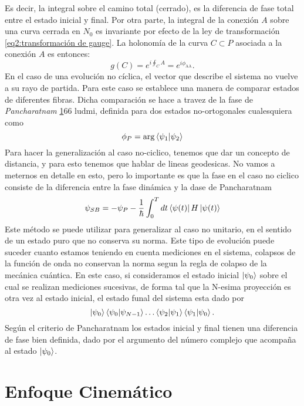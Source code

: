 Es decir, la integral sobre el camino total (cerrado), es la diferencia de fase total entre el estado inicial y final. Por otra parte, la integral de la conexión \( A \) sobre una curva cerrada en \( N_0 \) es invariante por efecto de la ley de transformación \ref{eq2:transformación de gauge}. La holonomía de la curva \( C \subset P \) asociada a la conexión \( A \) es entonces:
\begin{equation}
g(C) = e^{i \oint_C A} = e^{i\phi_{\text{AA}}}.
\end{equation}
En el caso de una evolución no cíclica, el vector que describe el sistema no vuelve a su rayo de partida. Para este caso se establece una manera de comparar estados de diferentes fibras. Dicha comparación se hace a travez de la fase de \textit{Pancharatnam} \ref{}66 ludmi, definida para dos estados no-ortogonales cualesquiera como
\begin{equation}
    \phi_P = \arg \braket{\psi_1}{\psi_2}
\end{equation}
Para hacer la generalización al caso no-ciclico, tenemos que dar un concepto de distancia, y para esto tenemos que hablar de lineas geodesicas. No vamos a meternos en detalle en esto, pero lo importante es que la fase en el caso no ciclico consiste de la diferencia entre la fase dinámica y la dase de Pancharatnam
\begin{equation}
    \psi_{SB}=-\psi_P-\frac{1}{\hbar}\int_0^Tdt\bra{\psi(t)}H\ket{\psi(t)}
\end{equation}
Este método se puede utilizar para generalizar al caso no unitario, en el sentido de un estado puro que no conserva su norma. Este tipo de evolución puede suceder cuanto estamos teniendo en cuenta mediciones en el sistema, colapsos de la función de onda no conservan la norma segun la regla de colapso de la mecánica cuántica. En este caso, si consideramos el estado inicial $\ket{\psi_0}$ sobre el cual se realizan mediciones sucesivas, de forma tal que la N-esima proyección es otra vez al estado inicial, el estado funal del sistema esta dado por
\begin{equation}
    \ket{\psi_0}\braket{\psi_0}{\psi_{N-1}}\dots\braket{\psi_2}{\psi_1}\braket{\psi_1}{\psi_0}.
\end{equation}
Según el criterio de Pancharatnam los estados inicial y final tienen una diferencia de fase bien definida, dado por el argumento del número complejo que acompaña al estado $\ket{\psi_0}$.


\section{Enfoque Cinemático}

